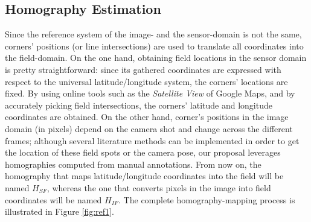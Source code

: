 \documentclass{article}
\begin{document}
\subsection{Homography Estimation}
Since the reference system of the image- and the sensor-domain is not the same, corners' positions (or line intersections) are used to translate all coordinates into the field-domain. On the one hand, obtaining field locations in the sensor domain is pretty straightforward: since its gathered coordinates are expressed with respect to the universal latitude/longitude system, the corners' locations are fixed. By using online tools such as the \textit{Satellite View} of Google Maps, and by accurately picking field intersections, the corners' latitude and longitude coordinates are obtained. On the other hand, corner's positions in the image domain (in pixels) depend on the camera shot and change across the different frames; although several literature methods \cite{citraro2020real} can be implemented in order to get the location of these field spots or the camera pose, our proposal leverages homographies computed from manual annotations. %
From now on, the homography that maps latitude/longitude coordinates into the field will be named $H_{SF}$, whereas the one that converts pixels in the image into field coordinates will be named $H_{IF}$. The complete homography-mapping process is illustrated in Figure \ref{fig:ref1}.\\
\end{document}
